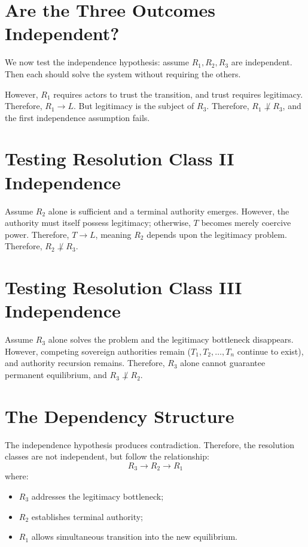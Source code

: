 \documentclass[11pt,openany]{book}
\theoremstyle{plain}
\theoremstyle{definition}
\begin{document}
\section*{Are the Three Outcomes Independent?}

We now test the independence hypothesis: assume \(R_1, R_2, R_3\) are independent. Then each should solve the system without requiring the others. 

However, \(R_1\) requires actors to trust the transition, and trust requires legitimacy. Therefore, \(R_1 \to L\). But legitimacy is the subject of \(R_3\). Therefore, \(R_1 \not\perp R_3\), and the first independence assumption fails.

\section*{Testing Resolution Class II Independence}

Assume \(R_2\) alone is sufficient and a terminal authority emerges. However, the authority must itself possess legitimacy; otherwise, \(T\) becomes merely coercive power. Therefore, \(T \to L\), meaning \(R_2\) depends upon the legitimacy problem. Therefore, \(R_2 \not\perp R_3\).

\section*{Testing Resolution Class III Independence}

Assume \(R_3\) alone solves the problem and the legitimacy bottleneck disappears. However, competing sovereign authorities remain (\(T_1, T_2, \ldots, T_n\) continue to exist), and authority recursion remains. Therefore, \(R_3\) alone cannot guarantee permanent equilibrium, and \(R_3 \not\perp R_2\).

\section*{The Dependency Structure}

The independence hypothesis produces contradiction. Therefore, the resolution classes are not independent, but follow the relationship:
\[
R_3 \longrightarrow R_2 \longrightarrow R_1
\]
where:
\begin{itemize}
\item \(R_3\) addresses the legitimacy bottleneck;
\item \(R_2\) establishes terminal authority;
\item \(R_1\) allows simultaneous transition into the new equilibrium.
\end{itemize}
\end{document}
